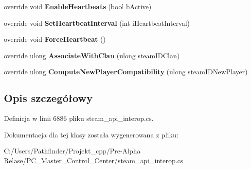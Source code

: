 \begin{DoxyCompactItemize}
\item 
\mbox{\label{class_valve_1_1_steamworks_1_1_c_steam_game_server_a84215cbc66d99677bed1dd08ed40739a}} 
override void {\bfseries Enable\+Heartbeats} (bool b\+Active)
\item 
\mbox{\label{class_valve_1_1_steamworks_1_1_c_steam_game_server_a5417f3417fe953efb30bc143e3c00e89}} 
override void {\bfseries Set\+Heartbeat\+Interval} (int i\+Heartbeat\+Interval)
\item 
\mbox{\label{class_valve_1_1_steamworks_1_1_c_steam_game_server_a4183c8919e246b29541470e88a3e1117}} 
override void {\bfseries Force\+Heartbeat} ()
\item 
\mbox{\label{class_valve_1_1_steamworks_1_1_c_steam_game_server_a221dc55eae3321c5dce3cef614f174c5}} 
override ulong {\bfseries Associate\+With\+Clan} (ulong steam\+I\+D\+Clan)
\item 
\mbox{\label{class_valve_1_1_steamworks_1_1_c_steam_game_server_a0155925cdad041b7cdd34e45d3433c30}} 
override ulong {\bfseries Compute\+New\+Player\+Compatibility} (ulong steam\+I\+D\+New\+Player)
\end{DoxyCompactItemize}


\subsection{Opis szczegółowy}


Definicja w linii 6886 pliku steam\+\_\+api\+\_\+interop.\+cs.



Dokumentacja dla tej klasy została wygenerowana z pliku\+:\begin{DoxyCompactItemize}
\item 
C\+:/\+Users/\+Pathfinder/\+Projekt\+\_\+cpp/\+Pre-\/\+Alpha Relase/\+P\+C\+\_\+\+Master\+\_\+\+Control\+\_\+\+Center/steam\+\_\+api\+\_\+interop.\+cs\end{DoxyCompactItemize}
